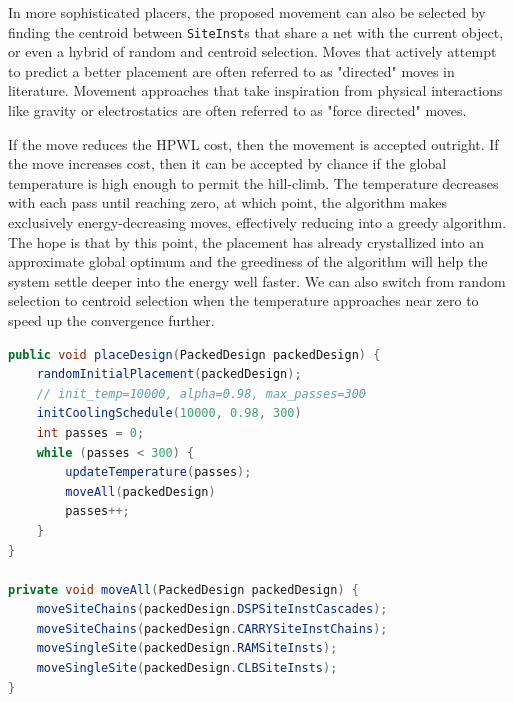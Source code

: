 In more sophisticated placers, the proposed movement can also be selected by finding the centroid between \texttt{SiteInst}s that share a net with the current object, or even a hybrid of random and centroid selection. 
Moves that actively attempt to predict a better placement are often referred to as "directed" moves in literature. 
Movement approaches that take inspiration from physical interactions like gravity or electrostatics are often referred to as "force directed" moves. 

If the move reduces the HPWL cost, then the movement is accepted outright.
If the move increases cost, then it can be accepted by chance if the global temperature is high enough to permit the hill-climb.
The temperature decreases with each pass until reaching zero, at which point, the algorithm makes exclusively energy-decreasing moves, effectively reducing into a greedy algorithm. 
The hope is that by this point, the placement has already crystallized into an approximate global optimum and the greediness of the algorithm will help the system settle deeper into the energy well faster. 
We can also switch from random selection to centroid selection when the temperature approaches near zero to speed up the convergence further. 

\newcolumn
\begin{lstlisting}[language=java, caption={SA pseudocode: outer loop}, label={lst:sa_outer}]
public void placeDesign(PackedDesign packedDesign) {
    randomInitialPlacement(packedDesign);
    // init_temp=10000, alpha=0.98, max_passes=300
    initCoolingSchedule(10000, 0.98, 300)
    int passes = 0;
    while (passes < 300) {
        updateTemperature(passes);
        moveAll(packedDesign)
        passes++;
    }
}

private void moveAll(PackedDesign packedDesign) {
    moveSiteChains(packedDesign.DSPSiteInstCascades);
    moveSiteChains(packedDesign.CARRYSiteInstChains);
    moveSingleSite(packedDesign.RAMSiteInsts);
    moveSingleSite(packedDesign.CLBSiteInsts);
}
\end{lstlisting}


